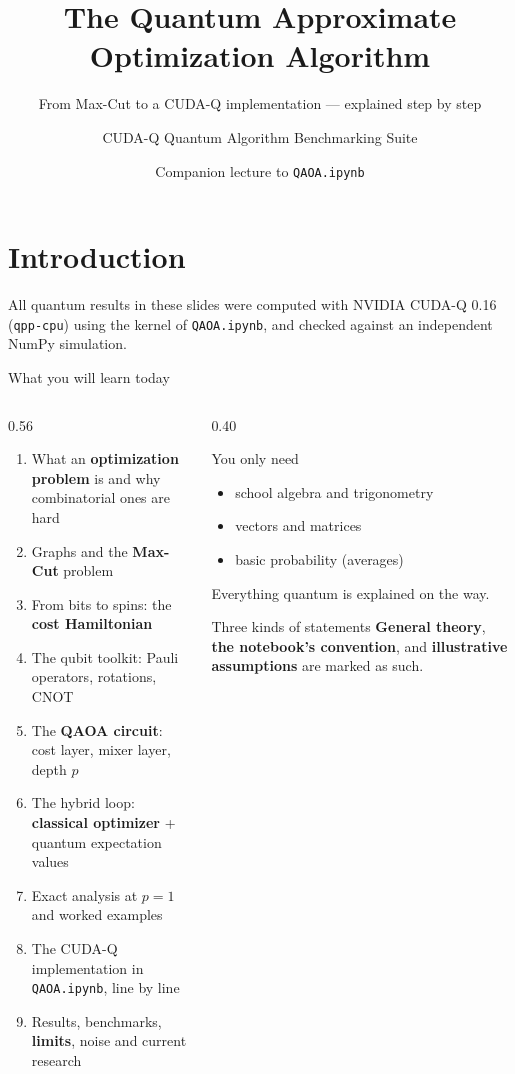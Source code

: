 \documentclass[aspectratio=169,11pt]{beamer}
\title{The Quantum Approximate Optimization Algorithm}
\subtitle{From Max-Cut to a CUDA-Q implementation --- explained step by step}
\author{CUDA-Q Quantum Algorithm Benchmarking Suite}
\date{Companion lecture to \texttt{QAOA.ipynb}}
\newcommand{\key}[1]{{\color{qdark}\textbf{#1}}}
\begin{document}
\section{Introduction}
\begin{frame}
  \titlepage
  \centering\small\color{qgrey}
  All quantum results in these slides were computed with NVIDIA CUDA-Q 0.16 (\texttt{qpp-cpu}) using the kernel of
  \texttt{QAOA.ipynb}, and checked against an independent NumPy simulation.
\end{frame}

\begin{frame}{What you will learn today}
  \begin{columns}[T]
    \begin{column}{0.56\textwidth}
      \small
      \begin{enumerate}\itemsep0pt
        \item What an \key{optimization problem} is and why combinatorial ones are hard
        \item Graphs and the \key{Max-Cut} problem
        \item From bits to spins: the \key{cost Hamiltonian}
        \item The qubit toolkit: Pauli operators, rotations, CNOT
        \item The \key{QAOA circuit}: cost layer, mixer layer, depth $p$
        \item The hybrid loop: \key{classical optimizer} + quantum expectation values
        \item Exact analysis at $p = 1$ and worked examples
        \item The CUDA-Q implementation in \texttt{QAOA.ipynb}, line by line
        \item Results, benchmarks, \key{limits}, noise and current research
      \end{enumerate}
    \end{column}
    \begin{column}{0.40\textwidth}
      \begin{block}{You only need}
        \begin{itemize}
          \item school algebra and trigonometry
          \item vectors and matrices
          \item basic probability (averages)
        \end{itemize}
        Everything quantum is explained on the way.
      \end{block}
      \begin{alertblock}{Three kinds of statements}
        \small \textbf{General theory}, \textbf{the notebook's convention}, and \textbf{illustrative
        assumptions} are marked as such.
      \end{alertblock}
    \end{column}
  \end{columns}
\end{frame}
\end{document}

